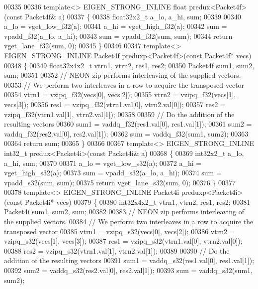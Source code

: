 \begin{DoxyCode}
{{00335 
00336 \textcolor{keyword}{template}<> EIGEN\_STRONG\_INLINE \textcolor{keywordtype}{float} predux<Packet4f>(\textcolor{keyword}{const} Packet4f& a)
00337 \{
00338   float32x2\_t a\_lo, a\_hi, sum;
00339 
00340   a\_lo = vget\_low\_f32(a);
00341   a\_hi = vget\_high\_f32(a);
00342   sum = vpadd\_f32(a\_lo, a\_hi);
00343   sum = vpadd\_f32(sum, sum);
00344   \textcolor{keywordflow}{return} vget\_lane\_f32(sum, 0);
00345 \}
00346 
00347 \textcolor{keyword}{template}<> EIGEN\_STRONG\_INLINE Packet4f preduxp<Packet4f>(\textcolor{keyword}{const} Packet4f* vecs)
00348 \{
00349   float32x4x2\_t vtrn1, vtrn2, res1, res2;
00350   Packet4f sum1, sum2, sum;
00351 
00352   \textcolor{comment}{// NEON zip performs interleaving of the supplied vectors.}
00353   \textcolor{comment}{// We perform two interleaves in a row to acquire the transposed vector}
00354   vtrn1 = vzipq\_f32(vecs[0], vecs[2]);
00355   vtrn2 = vzipq\_f32(vecs[1], vecs[3]);
00356   res1 = vzipq\_f32(vtrn1.val[0], vtrn2.val[0]);
00357   res2 = vzipq\_f32(vtrn1.val[1], vtrn2.val[1]);
00358 
00359   \textcolor{comment}{// Do the addition of the resulting vectors}
00360   sum1 = vaddq\_f32(res1.val[0], res1.val[1]);
00361   sum2 = vaddq\_f32(res2.val[0], res2.val[1]);
00362   sum = vaddq\_f32(sum1, sum2);
00363 
00364   \textcolor{keywordflow}{return} sum;
00365 \}
00366 
00367 \textcolor{keyword}{template}<> EIGEN\_STRONG\_INLINE int32\_t predux<Packet4i>(\textcolor{keyword}{const} Packet4i& a)
00368 \{
00369   int32x2\_t a\_lo, a\_hi, sum;
00370 
00371   a\_lo = vget\_low\_s32(a);
00372   a\_hi = vget\_high\_s32(a);
00373   sum = vpadd\_s32(a\_lo, a\_hi);
00374   sum = vpadd\_s32(sum, sum);
00375   \textcolor{keywordflow}{return} vget\_lane\_s32(sum, 0);
00376 \}
00377 
00378 \textcolor{keyword}{template}<> EIGEN\_STRONG\_INLINE Packet4i preduxp<Packet4i>(\textcolor{keyword}{const} Packet4i* vecs)
00379 \{
00380   int32x4x2\_t vtrn1, vtrn2, res1, res2;
00381   Packet4i sum1, sum2, sum;
00382 
00383   \textcolor{comment}{// NEON zip performs interleaving of the supplied vectors.}
00384   \textcolor{comment}{// We perform two interleaves in a row to acquire the transposed vector}
00385   vtrn1 = vzipq\_s32(vecs[0], vecs[2]);
00386   vtrn2 = vzipq\_s32(vecs[1], vecs[3]);
00387   res1 = vzipq\_s32(vtrn1.val[0], vtrn2.val[0]);
00388   res2 = vzipq\_s32(vtrn1.val[1], vtrn2.val[1]);
00389 
00390   \textcolor{comment}{// Do the addition of the resulting vectors}
00391   sum1 = vaddq\_s32(res1.val[0], res1.val[1]);
00392   sum2 = vaddq\_s32(res2.val[0], res2.val[1]);
00393   sum = vaddq\_s32(sum1, sum2);
}}
\end{DoxyCode}
